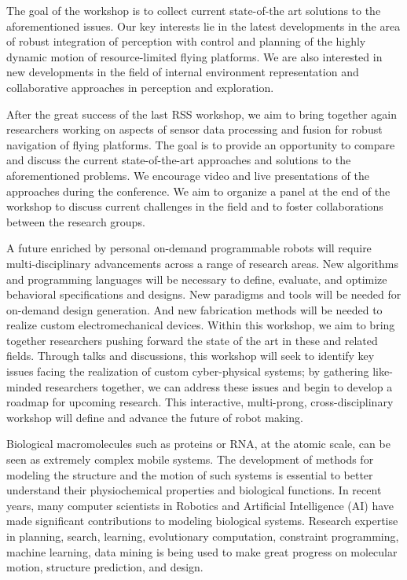 \begin{spacing}{1.0}
{The goal of the workshop is to collect current state-of-the art solutions to the aforementioned issues. Our key interests lie in the latest developments in the area of robust integration of perception with control and planning of the highly dynamic motion of resource-limited flying platforms. We are also interested in new developments in the field of internal environment representation and collaborative approaches in perception and exploration.

After the great success of the last RSS workshop, we aim to bring together again researchers working on aspects of sensor data processing and fusion for robust navigation of flying platforms. The goal is to provide an opportunity to compare and discuss the current state-of-the-art approaches and solutions to the aforementioned problems. We encourage video and live presentations of the approaches during the conference. We aim to organize a panel at the end of the workshop to discuss current challenges in the field and to foster collaborations between the research groups.
}



{
A future enriched by personal on-demand programmable robots will require multi-disciplinary advancements across a range of research areas. New algorithms and programming languages will be necessary to define, evaluate, and optimize behavioral specifications and designs. New paradigms and tools will be needed for on-demand design generation. And new fabrication methods will be needed to realize custom electromechanical devices. Within this workshop, we aim to bring together researchers pushing forward the state of the art in these and related fields. Through talks and discussions, this workshop will seek to identify key issues facing the realization of custom cyber-physical systems; by gathering like-minded researchers together, we can address these issues and begin to develop a roadmap for upcoming research. This interactive, multi-prong, cross-disciplinary workshop will define and advance the future of robot making.
}



{
Biological macromolecules such as proteins or RNA, at the atomic scale, can be seen as extremely complex mobile systems. The development of methods for modeling the structure and the motion of such systems is essential to better understand their physiochemical properties and biological functions. In recent years, many computer scientists in Robotics and Artificial Intelligence (AI) have made significant contributions to modeling biological systems. Research expertise in planning, search, learning, evolutionary computation, constraint programming, machine learning, data mining is being used to make great progress on molecular motion, structure prediction, and design. 

}
\end{spacing}
